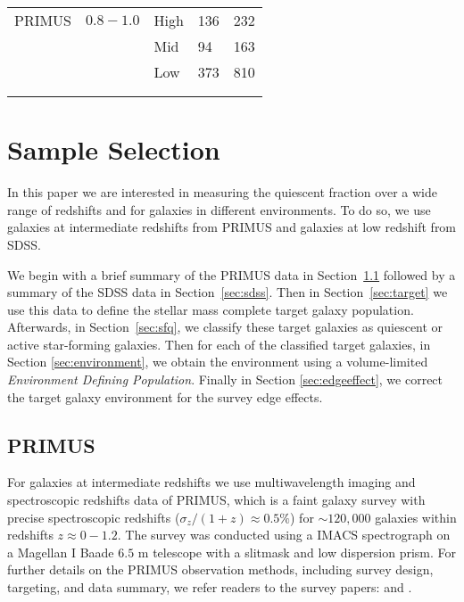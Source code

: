 \documentclass{emulateapj}
\begin{document}
\begin{table*}
\begin{center}
\begin{tabular}{lllll}
            &               &               &                       &                           \\ \hline
  PRIMUS    &$0.8-1.0$      &High           &136                       &232                           \\
            &               &Mid            &94                       &163                           \\
            &               &Low            &373                       &810                           \\
            &               &               &                       &                           \\ \hline
  \multicolumn{5}{l}{}                                             \\       
    \end{tabular} 
  \end{center}
\end{table*}

\section{Sample Selection}
In this paper we are interested in measuring the quiescent fraction over a wide range of redshifts and for galaxies in different environments. 
To do so, we use galaxies at intermediate redshifts from PRIMUS and galaxies at low redshift from SDSS.

We begin with a brief summary of the PRIMUS data in Section~\ref{sec:primus} followed by a summary of the SDSS data in Section~\ref{sec:sdss}.
Then in Section~\ref{sec:target} we use this data to define the stellar mass complete target galaxy population.
Afterwards, in Section~\ref{sec:sfq}, we classify these target galaxies as quiescent or active star-forming galaxies. 
Then for each of the classified target galaxies, in Section \ref{sec:environment}, we obtain the environment using a volume-limited {\em Environment Defining Population}.
Finally in Section \ref{sec:edgeeffect}, we correct the target galaxy environment for the survey edge effects. 

\subsection{PRIMUS} \label{sec:primus}
For galaxies at intermediate redshifts we use multiwavelength imaging and spectroscopic redshifts data of PRIMUS, which is a faint galaxy survey with precise spectroscopic redshifts ($\sigma_z/(1+z) \approx 0.5 \%$) for $\sim 120,000$ galaxies within redshifts $z \approx 0-1.2$.
The survey was conducted using a IMACS spectrograph on a Magellan I Baade $6.5$ m telescope with a slitmask and low dispersion prism.
For further details on the PRIMUS observation methods, including survey design, targeting, and data summary, we refer readers to the survey papers: \cite{Coil:2011aa} and \cite{Cool:2013aa}.
\end{document}

